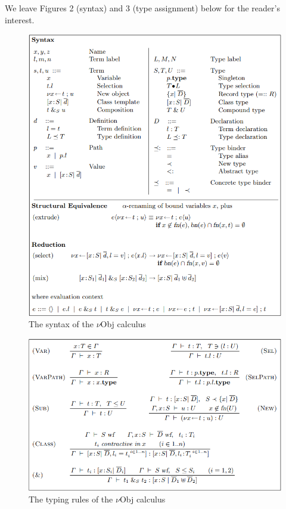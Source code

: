 \documentclass[jou,apacite]{IEEEtran}
\begin{document}
We leave Figures 2 (syntax) and 3 (type assignment) below for the reader's
interest.
\begin{figure}[h]
  \centering
  \includegraphics[width=\columnwidth]{syntax}
  \caption{The syntax of the $\nu$Obj calculus}
  \label{fig:example}
\end{figure}

\begin{figure}[h]
  \centering
  \includegraphics[width=\columnwidth]{typecheck}
  \caption{The typing rules of the $\nu$Obj calculus}
  \label{fig:example}
\end{figure}
\end{document}

